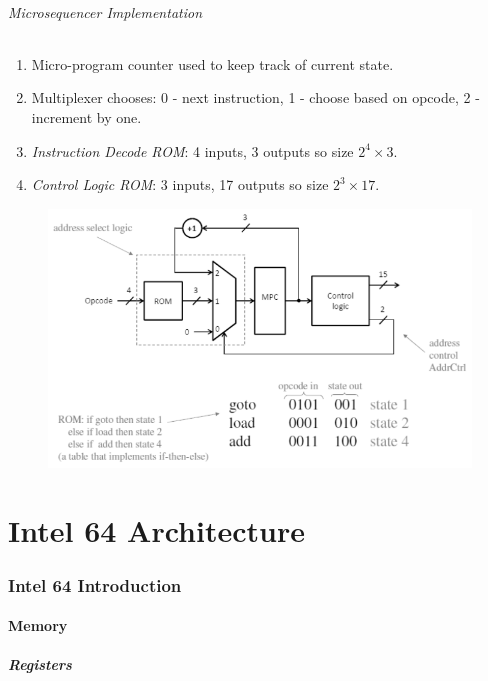\documentclass[twocolumn,english]{article}
\begin{document}
\paragraph{Microsequencer Implementation}
\begin{enumerate}
\item Micro-program counter used to keep track of current state.
\item Multiplexer chooses: 0 - next instruction, 1 - choose based on opcode,
2 - increment by one.
\item \emph{Instruction Decode ROM}: 4 inputs, 3 outputs so size $2^{4}\times3$.
\item \emph{Control Logic ROM}: 3 inputs, 17 outputs so size $2^{3}\times17$.
\end{enumerate}
\begin{figure}[H]
\noindent \centering{}\includegraphics[scale=0.375]{img/microsequencer-implementation}
\end{figure}



\part{Intel 64 Architecture}


\section{Intel 64 Introduction}


\subsection{Memory}


\subsubsection{Registers}
\end{document}
